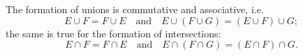 The formation of unions is commutative and associative, i.e.
$$E \cup F = F \cup E \quad \text{and} \quad E \cup (F \cup G) = (E \cup F) \cup G;$$
the same is true for the formation of intersections:
$$E \cap F = F \cap E \quad \text{and} \quad E \cap (F \cap G) = (E \cap F) \cap G.$$
